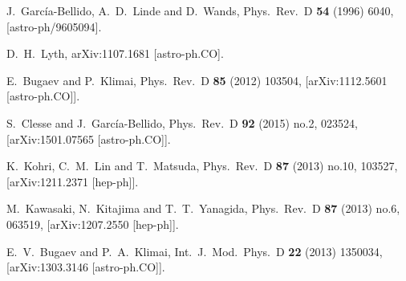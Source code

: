 \begin{thebibliography}{10}
  J.~García-Bellido, A.~D.~Linde and D.~Wands,
  Phys.\ Rev.\ D {\bf 54} (1996) 6040,
  [astro-ph/9605094].


  D.~H.~Lyth,
  arXiv:1107.1681 [astro-ph.CO].


  E.~Bugaev and P.~Klimai,
  Phys.\ Rev.\ D {\bf 85} (2012) 103504,
  [arXiv:1112.5601 [astro-ph.CO]].


  S.~Clesse and J.~García-Bellido,
  Phys.\ Rev.\ D {\bf 92} (2015) no.2,  023524,
  [arXiv:1501.07565 [astro-ph.CO]].


  K.~Kohri, C.~M.~Lin and T.~Matsuda,
  Phys.\ Rev.\ D {\bf 87} (2013) no.10,  103527,
  [arXiv:1211.2371 [hep-ph]].


  M.~Kawasaki, N.~Kitajima and T.~T.~Yanagida,
  Phys.\ Rev.\ D {\bf 87} (2013) no.6,  063519,
  [arXiv:1207.2550 [hep-ph]].


  E.~V.~Bugaev and P.~A.~Klimai,
  Int.\ J.\ Mod.\ Phys.\ D {\bf 22} (2013) 1350034,
  [arXiv:1303.3146 [astro-ph.CO]].



\end{thebibliography}
